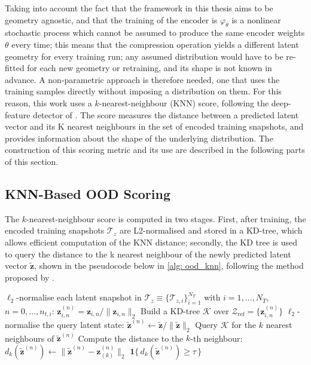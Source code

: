  Taking into account the fact that the framework in this thesis aims to be geometry agnostic, and that the training of the encoder is $\varphi_\theta$ is a nonlinear stochastic process which cannot be assumed to produce the same encoder weights $\theta$ every time; this means that the compression operation yields a different latent geometry for every training run; any assumed distribution would have to be re-fitted for each new geometry or retraining, and its shape is not known in advance. A non-parametric approach is therefore needed, one that uses the training samples directly without imposing a distribution on them. For this reason, this work uses a $k$-nearest-neighbour (KNN) score, following the deep-feature detector of \textcite{Sun2022}. The score measures the distance between a predicted latent vector and its K nearest neighbours in the set of encoded training snapshots, and provides information about the shape of the underlying distribution. The construction of this scoring metric and its use are described in the following parts of this section. 


\subsection{KNN-Based OOD Scoring}
\label{sect: KNN}

The $k$-nearest-neighbour score is computed in two stages. First, after training, the encoded training snapshots $\boldsymbol{\mathcal{T}}_{z}$ are L2-normalised and stored in a KD-tree, which allows efficient computation of the KNN distance; secondly, the KD tree is used to query the distance to the k nearest neighbour of the newly predicted latent vector $\tilde{\mathbf{z}}$, shown in the pseudocode below in \autoref{alg: ood_knn}, following the method proposed by \textcite{Sun2022}.

\begin{algorithm}[H]
\SetAlgoLined
\DontPrintSemicolon
\caption{OOD Detection with Deep Nearest Neighbours in the Latent Space}
\label{alg: ood_knn}
$\ell_2$-normalise each latent snapshot in $\boldsymbol{\mathcal{T}}_{z} \equiv \{\mathcal{T}_{z,i}\}_{i=1}^{N_T}$ with $i = 1,\ldots,N_T$, $n = 0,\ldots,n_{t,i}$:\;
\hspace{1em} $\mathbf{z}^{(n)}_{i,n} = \mathbf{z}_{i,n} / \|\mathbf{z}_{i,n}\|_2$\;
Build a KD-tree $\mathcal{K}$ over $\mathcal{Z}_\text{ref} = \{ \mathbf{z}^{(n)}_{i,n}\}$\;
$\ell_2$-normalise the query latent state: $\tilde{\mathbf{z}}^{(n)} \gets \tilde{\mathbf{z}} / \|\tilde{\mathbf{z}}\|_2$\;
Query $\mathcal{K}$ for the $k$ nearest neighbours of $\tilde{\mathbf{z}}^{(n)}$\;
Compute the distance to the $k$-th neighbour: $d_k(\tilde{\mathbf{z}}^{(n)}) \gets \|\tilde{\mathbf{z}}^{(n)} - \mathbf{z}^{(n)}_{(k)}\|_2$\;
\Return $\mathbf{1}\{\,d_k(\tilde{\mathbf{z}}^{(n)}) \geq \tau\,\}$
\end{algorithm}

